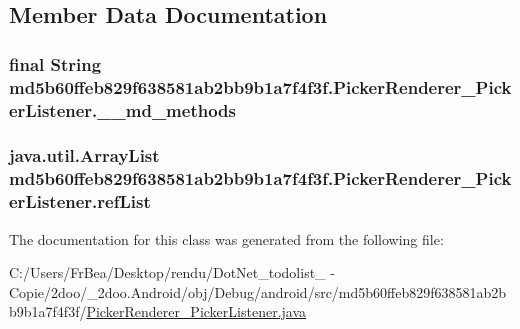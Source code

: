 \subsection{Member Data Documentation}
\hypertarget{classmd5b60ffeb829f638581ab2bb9b1a7f4f3f_1_1_picker_renderer___picker_listener_69ae8fbc93864ac38ac6d4c96542e2b5}{
\subsubsection[{\_\-\_\-md\_\-methods}]{\setlength{\rightskip}{0pt plus 5cm}final String {\bf md5b60ffeb829f638581ab2bb9b1a7f4f3f.PickerRenderer\_\-PickerListener.\_\-\_\-md\_\-methods}}}
\label{classmd5b60ffeb829f638581ab2bb9b1a7f4f3f_1_1_picker_renderer___picker_listener_69ae8fbc93864ac38ac6d4c96542e2b5}


\hypertarget{classmd5b60ffeb829f638581ab2bb9b1a7f4f3f_1_1_picker_renderer___picker_listener_5a5c7704983e4c275b2f8194214c4e9c}{
\subsubsection[{refList}]{\setlength{\rightskip}{0pt plus 5cm}java.util.ArrayList {\bf md5b60ffeb829f638581ab2bb9b1a7f4f3f.PickerRenderer\_\-PickerListener.refList}}}
\label{classmd5b60ffeb829f638581ab2bb9b1a7f4f3f_1_1_picker_renderer___picker_listener_5a5c7704983e4c275b2f8194214c4e9c}




The documentation for this class was generated from the following file:\begin{CompactItemize}
\item 
C:/Users/FrBea/Desktop/rendu/DotNet\_\-todolist\_ - Copie/2doo/\_\-2doo.Android/obj/Debug/android/src/md5b60ffeb829f638581ab2bb9b1a7f4f3f/\hyperlink{md5b60ffeb829f638581ab2bb9b1a7f4f3f_2_picker_renderer___picker_listener_8java}{PickerRenderer\_\-PickerListener.java}\end{CompactItemize}
